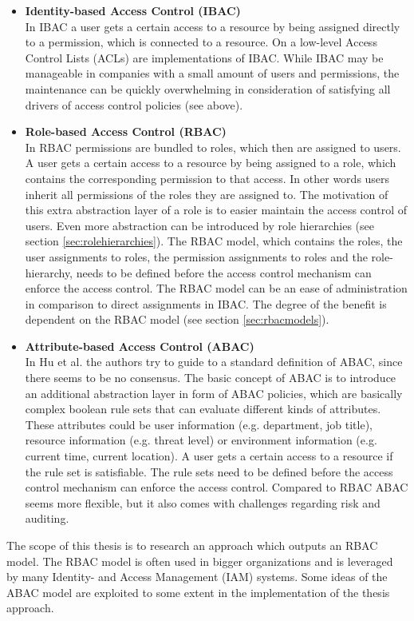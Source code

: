     \begin{itemize}
        \iffalse \item \textbf{Discretionary Access Control (DAC)}\\\fi
        \item \textbf{Identity-based Access Control (IBAC)}\\
        In IBAC a user gets a certain access to a resource by being assigned directly to a permission, which is connected to a resource. On a low-level Access Control Lists (ACLs) are implementations of IBAC. While IBAC may be manageable in companies with a small amount of users and permissions, the maintenance can be quickly overwhelming in consideration of satisfying all drivers of access control policies (see above).
        \item \textbf{Role-based Access Control (RBAC)}\\
        In RBAC permissions are bundled to roles, which then are assigned to users. A user gets a certain access to a resource by being assigned to a role, which contains the corresponding permission to that access. In other words users inherit all permissions of the roles they are assigned to. The motivation of this extra abstraction layer of a role is to easier maintain the access control of users.
        Even more abstraction can be introduced by role hierarchies (see section \ref{sec:rolehierarchies}). \iffalse , where a role inherits all permissions of its parent-role.\fi The RBAC model, which contains the roles, the user assignments to roles, the permission assignments to roles and the role-hierarchy, needs to be defined before the access control mechanism can enforce the access control. The RBAC model can be an ease of administration in comparison to direct assignments in IBAC. The degree of the benefit is dependent on the RBAC model (see section \ref{sec:rbacmodels}).
        \item \textbf{Attribute-based Access Control (ABAC)}\\
        In Hu et al.\cite{Hu13guideto} the authors try to guide to a standard definition of ABAC, since there seems to be no consensus. The basic concept of ABAC is to introduce an additional abstraction layer in form of ABAC policies, which are basically complex boolean rule sets that can evaluate different kinds of attributes. These attributes could be user information (e.g. department, job title), resource information (e.g. threat level) or environment information (e.g. current time, current location). A user gets a certain access to a resource if the rule set is satisfiable. The rule sets need to be defined before the access control mechanism can enforce the access control. Compared to RBAC ABAC seems more flexible, but it also comes with challenges regarding risk and auditing\cite{Coyne:2013}.
    \end{itemize}
    The scope of this thesis is to research an approach which outputs an RBAC model. The RBAC model is often used in bigger organizations\cite{o20102010} and is leveraged by many Identity- and Access Management (IAM) systems. Some ideas of the ABAC model are exploited to some extent in the implementation of the thesis approach.
